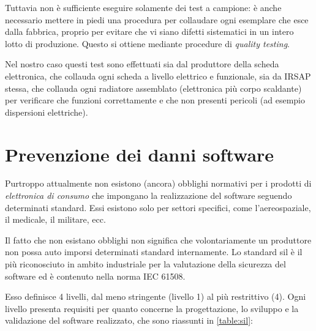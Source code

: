 \documentclass[12pt,a4paper,twoside,titlepage]{book}
\begin{document}
Tuttavia non è sufficiente eseguire solamente dei test a campione: è anche necessario mettere 
in piedi una procedura per collaudare ogni esemplare che esce dalla fabbrica, proprio per evitare che vi siano 
difetti sistematici in un intero lotto di produzione. Questo si ottiene mediante procedure di \textit{quality testing}. 

Nel nostro caso questi test sono effettuati sia dal produttore della scheda elettronica, 
che collauda ogni scheda a livello elettrico e funzionale, sia da IRSAP stessa, che collauda ogni radiatore 
assemblato (elettronica più corpo scaldante) per verificare che funzioni correttamente e che non presenti 
pericoli (ad esempio dispersioni elettriche). 

\section{Prevenzione dei danni software}

Purtroppo attualmente non esistono (ancora) obblighi normativi per 
i prodotti di \textit{elettronica di consumo} che impongano la realizzazione del software seguendo determinati 
standard. Essi esistono solo per settori specifici, come l'aereospaziale, il medicale, il militare, ecc. 

Il fatto che non esistano obblighi non significa che volontariamente un produttore non possa auto imporsi determinati 
standard internamente. Lo standard \acrfull{sil} è il più riconosciuto in ambito industriale per la valutazione 
della sicurezza del software ed è contenuto nella norma IEC 61508. 

Esso definisce 4 livelli, dal meno stringente (livello 1) al più restrittivo (4). Ogni 
livello presenta requisiti per quanto concerne la progettazione, lo sviluppo e la validazione 
del software realizzato, che sono riassunti in \autoref{table:sil}:
\end{document}
